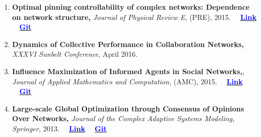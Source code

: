 \documentclass[letter]{res}
\begin{document}
\begin{resume}
\begin{enumerate}[leftmargin=-.01in]
                        \item \textbf{Optimal pinning controllability of complex networks: Dependence on network structure,} \textit{Journal of Physical Review E}, (PRE), 2015.
                        ~~\href{http://link.aps.org/doi/10.1103/PhysRevE.91.012803}{\textbf{\textcolor{blue}{Link}}}
                        ~~\href{https://github.com/omid55/optimal_pinning_control}{\textbf{\textcolor{blue}{Git}}}
			
                        \item \textbf{Dynamics of Collective Performance in Collaboration Networks,} \textit{XXXVI Sunbelt Conference}, April 2016.

			\item \textbf{Influence Maximization of Informed Agents in Social Networks,}, \textit{Journal of Applied Mathematics and Computation}, (AMC), 2015.
			~~\href{http://dx.doi.org/10.1016/j.amc.2014.12.139}{\textbf{\textcolor{blue}{Link}}}
			~~\href{https://github.com/omid55/influence_maximization}{\textbf{\textcolor{blue}{Git}}}
			
			\item \textbf{Large-scale Global Optimization through Consensus of Opinions Over Networks,} \textit{Journal of the Complex Adaptive Systems Modeling}, \textit{Springer}, 2013.
			~~\href{http://www.casmodeling.com/content/1/1/11}{\textbf{\textcolor{blue}{Link}}}
			~~\href{https://github.com/omid55/optimization_opinion_formation}{\textbf{\textcolor{blue}{Git}}}
			

\end{enumerate}
\end{resume}
\end{document}
